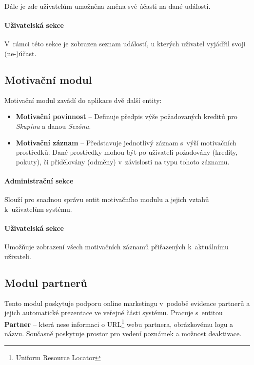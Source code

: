 \documentclass[11pt,oneside]{fithesis}
\begin{document}
            Dále je zde uživatelům umožněna změna své účasti na dané události.

            \paragraph*{Uživatelská sekce}

            V rámci této sekce je zobrazen seznam událostí, u kterých uživatel vyjádřil svoji (ne-)účast.

                \subsection{Motivační modul}
            Motivační modul zavádí do aplikace dvě další entity:
            \begin{itemize}
                \item \textbf{Motivační povinnost} – Definuje předpis výše požadovaných kreditů pro \textit{Skupinu} a danou \textit{Sezónu}.
                \item \textbf{Motivační záznam} – Představuje jednotlivý záznam s výší motivačních prostředků. Dané prostředky mohou být po uživateli požadovány (kredity, pokuty), či přidělovány (odměny) v závislosti na typu tohoto záznamu.
            \end{itemize}

            \paragraph*{Administrační sekce}

           Slouží pro snadnou správu entit motivačního modulu a jejich vztahů k uživatelům systému.

           \paragraph*{Uživatelská sekce}

           Umožňuje zobrazení všech motivačních záznamů přiřazených k aktuálnímu uživateli.
            
            \subsection{Modul partnerů}
            Tento modul poskytuje podporu online marketingu v podobě evidence partnerů a jejich automatické prezentace ve veřejné části systému. Pracuje s entitou \textbf{Partner} – která nese informaci o URL\footnote{Uniform Resource Locator} webu partnera, obrázkovému logu a názvu. Současně poskytuje prostor pro vedení poznámek a možnost deaktivace.
\end{document}
